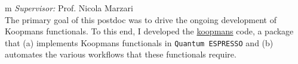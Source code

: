 \documentclass[10pt,a4paper,final]{article}
\begin{document}
\begin{tabularx}{\textwidth}{
   m{\dimexpr{}\tabcolsep}}
   \textit{Supervisor:} Prof. Nicola Marzari
   \\
   The primary goal of this postdoc was to drive the ongoing development of Koopmans functionals. To this end, I developed the \href{https://koopmans-functionals.org/}{koopmans} code, a package that (a) implements Koopmans functionals in \texttt{Quantum ESPRESSO} and (b) automates the various workflows that these functionals require.
   \\
   \hbox{%
   }
   

\end{tabularx}
\end{document}
